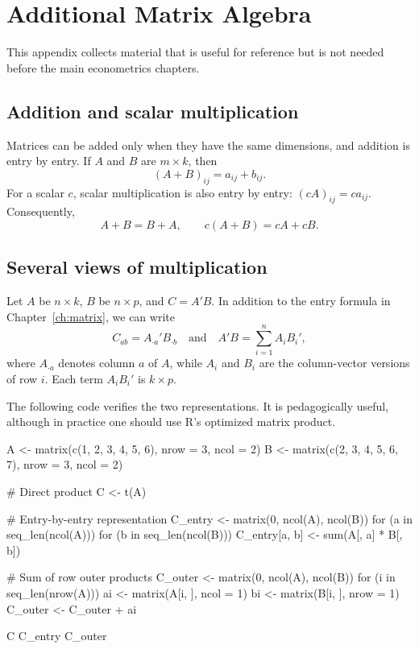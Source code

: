 \chapter{Additional Matrix Algebra}
\label{app:matrix}

This appendix collects material that is useful for reference but is not
needed before the main econometrics chapters.

\section{Addition and scalar multiplication}

Matrices can be added only when they have the same dimensions, and addition
is entry by entry.  If $A$ and $B$ are $m\times k$, then
\[
  (A+B)_{ij}=a_{ij}+b_{ij}.
\]
For a scalar $c$, scalar multiplication is also entry by entry:
$(cA)_{ij}=ca_{ij}$.  Consequently,
\[
  A+B=B+A,\qquad c(A+B)=cA+cB.
\]

\section{Several views of multiplication}

Let $A$ be $n\times k$, $B$ be $n\times p$, and $C=A'B$.  In addition to
the entry formula in Chapter~\ref{ch:matrix}, we can write
\[
  C_{ab}=A_{\cdot a}'B_{\cdot b}
  \quad\text{and}\quad
  A'B=\sum_{i=1}^{n}A_iB_i',
\]
where $A_{\cdot a}$ denotes column $a$ of $A$, while $A_i$ and $B_i$ are the
column-vector versions of row $i$.  Each term $A_iB_i'$ is $k\times p$.

The following code verifies the two representations.  It is pedagogically
useful, although in practice one should use R's optimized matrix product.

\begin{rcode}
A <- matrix(c(1, 2, 3, 4, 5, 6), nrow = 3, ncol = 2)
B <- matrix(c(2, 3, 4, 5, 6, 7), nrow = 3, ncol = 2)

# Direct product
C <- t(A) %

# Entry-by-entry representation
C_entry <- matrix(0, ncol(A), ncol(B))
for (a in seq_len(ncol(A))) {
  for (b in seq_len(ncol(B))) {
    C_entry[a, b] <- sum(A[, a] * B[, b])
  }
}

# Sum of row outer products
C_outer <- matrix(0, ncol(A), ncol(B))
for (i in seq_len(nrow(A))) {
  ai <- matrix(A[i, ], ncol = 1)
  bi <- matrix(B[i, ], nrow = 1)
  C_outer <- C_outer + ai %
}

C
C_entry
C_outer
\end{rcode}

